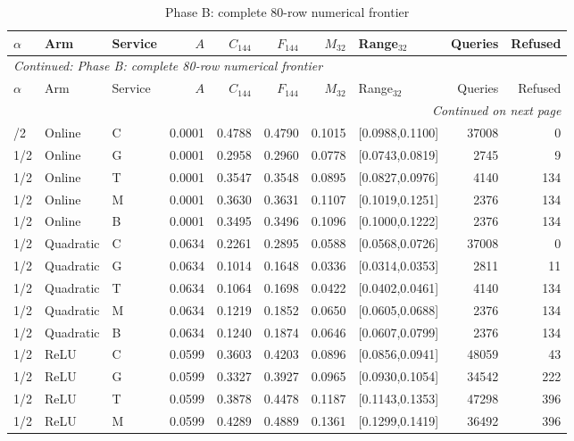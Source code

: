 \begingroup\footnotesize\setlength{\tabcolsep}{3pt}
\begin{longtable}{lllrrrrlrr}
\caption{Phase B: complete 80-row numerical frontier}\label{tab:frontier119b}\\
\toprule
$\alpha$ & Arm & Service & $A$ & $C_{144}$ & $F_{144}$ & $M_{32}$ & Range$_{32}$ & Queries & Refused\\\midrule
\endfirsthead
\multicolumn{10}{l}{\textit{Continued: Phase B: complete 80-row numerical frontier}}\\
\toprule
$\alpha$ & Arm & Service & $A$ & $C_{144}$ & $F_{144}$ & $M_{32}$ & Range$_{32}$ & Queries & Refused\\\midrule
\endhead
\midrule\multicolumn{10}{r}{\textit{Continued on next page}}\\
\endfoot
\bottomrule
\endlastfoot
1/2 & Online & C & 0.0001 & 0.4788 & 0.4790 & 0.1015 & [0.0988,0.1100] & 37008 & 0 \\
1/2 & Online & G & 0.0001 & 0.2958 & 0.2960 & 0.0778 & [0.0743,0.0819] & 2745 & 9 \\
1/2 & Online & T & 0.0001 & 0.3547 & 0.3548 & 0.0895 & [0.0827,0.0976] & 4140 & 134 \\
1/2 & Online & M & 0.0001 & 0.3630 & 0.3631 & 0.1107 & [0.1019,0.1251] & 2376 & 134 \\
1/2 & Online & B & 0.0001 & 0.3495 & 0.3496 & 0.1096 & [0.1000,0.1222] & 2376 & 134 \\
1/2 & Quadratic & C & 0.0634 & 0.2261 & 0.2895 & 0.0588 & [0.0568,0.0726] & 37008 & 0 \\
1/2 & Quadratic & G & 0.0634 & 0.1014 & 0.1648 & 0.0336 & [0.0314,0.0353] & 2811 & 11 \\
1/2 & Quadratic & T & 0.0634 & 0.1064 & 0.1698 & 0.0422 & [0.0402,0.0461] & 4140 & 134 \\
1/2 & Quadratic & M & 0.0634 & 0.1219 & 0.1852 & 0.0650 & [0.0605,0.0688] & 2376 & 134 \\
1/2 & Quadratic & B & 0.0634 & 0.1240 & 0.1874 & 0.0646 & [0.0607,0.0799] & 2376 & 134 \\
1/2 & ReLU & C & 0.0599 & 0.3603 & 0.4203 & 0.0896 & [0.0856,0.0941] & 48059 & 43 \\
1/2 & ReLU & G & 0.0599 & 0.3327 & 0.3927 & 0.0965 & [0.0930,0.1054] & 34542 & 222 \\
1/2 & ReLU & T & 0.0599 & 0.3878 & 0.4478 & 0.1187 & [0.1143,0.1353] & 47298 & 396 \\
1/2 & ReLU & M & 0.0599 & 0.4289 & 0.4889 & 0.1361 & [0.1299,0.1419] & 36492 & 396 \\

\end{longtable}
